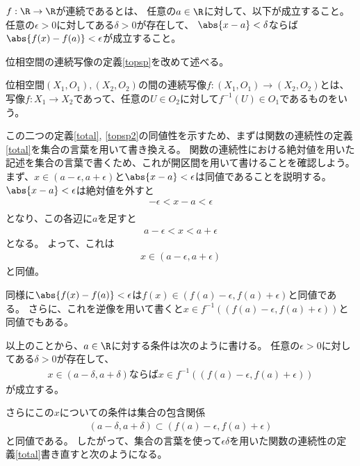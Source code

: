 \documentclass[uplatex]{jsarticle}
\begin{document}
\begin{dfn}[関数の連続性]\label{total}
  $f:\R \to \R$が連続であるとは、
  任意の$a\in\R$に対して、以下が成立すること。
  任意の$\epsilon>0$に対してある$\delta>0$が存在して、
  $\abs{x-a}<\delta$ならば$\abs{f(x)-f(a)}<\epsilon$が成立すること。
\end{dfn}

位相空間の連続写像の定義\ref{topsp}を改めて述べる。
\begin{dfn}[位相空間の間の連続写像]\label{topsp2}
  位相空間$(X_1,O_1), (X_2,O_2)$の間の連続写像$f:(X_1,O_1)\to(X_2,O_2)$とは、
  写像$f:X_1\to X_2$であって、任意の$U\in O_2$に対して$f^{-1}(U)\in O_1$であるものをいう。
\end{dfn}

この二つの定義\ref{total}, \ref{topsp2}の同値性を示すため、まずは関数の連続性の定義\ref{total}を集合の言葉を用いて書き換える。
関数の連続性における絶対値を用いた記述を集合の言葉で書くため、これが開区間を用いて書けることを確認しよう。
まず、$x\in(a-\epsilon,a+\epsilon)$と$\abs{x-a}<\epsilon$は同値であることを説明する。
$\abs{x-a}<\epsilon$は絶対値を外すと
\begin{align*}
  -\epsilon<x-a<\epsilon\\
\end{align*}
となり、この各辺に$a$を足すと
\begin{align*}
  a-\epsilon<x<a+\epsilon
\end{align*}
となる。
よって、これは
\begin{align*}
  x\in(a-\epsilon,a+\epsilon)
\end{align*}
と同値。

同様に$\abs{f(x)-f(a)}<\epsilon$は$f(x)\in(f(a)-\epsilon,f(a)+\epsilon)$と同値である。
さらに、これを逆像を用いて書くと$x\in f^{-1}((f(a)-\epsilon,f(a)+\epsilon))$と同値でもある。

以上のことから、$a\in\R$に対する条件は次のように書ける。
任意の$\epsilon>0$に対してある$\delta>0$が存在して、
\begin{align*}
  x\in(a-\delta,a+\delta)\mbox{ならば}x\in f^{-1}((f(a)-\epsilon,f(a)+\epsilon))
\end{align*}
が成立する。

さらにこの$x$についての条件は集合の包含関係
\begin{align*}
  (a-\delta,a+\delta)\subset(f(a)-\epsilon,f(a)+\epsilon)
\end{align*}
と同値である。
したがって、集合の言葉を使って$\epsilon\delta$を用いた関数の連続性の定義\ref{total}書き直すと次のようになる。
\end{document}

